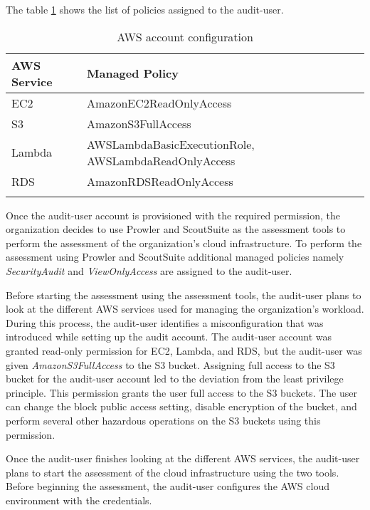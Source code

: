 The table \ref{tab:accountconfiguration} shows the list
of policies assigned to the audit-user.
\\
\begin{longtable}{|p{6cm}|p{8cm}|}
    \hline
    \textbf{AWS Service} & \textbf{Managed Policy}\\
    \hline
    EC2 & AmazonEC2ReadOnlyAccess \\
    \hline
    S3 & AmazonS3FullAccess \\
    \hline
    Lambda & AWSLambdaBasicExecutionRole,
    AWSLambdaReadOnlyAccess \\
    \hline
    RDS & AmazonRDSReadOnlyAccess \\
    \hline
    \caption{AWS account configuration}
    \label{tab:accountconfiguration}
\end{longtable}



\par Once the audit-user account is provisioned with the
required permission, the organization decides to
use Prowler and ScoutSuite as the assessment tools to perform the assessment of the organization’s cloud infrastructure.
To perform the assessment using Prowler and ScoutSuite additional managed policies namely \textit{SecurityAudit} and \textit{ViewOnlyAccess} are assigned to the audit-user.

\par Before starting the assessment using the assessment tools, the audit-user plans to look at the different AWS services used for managing the organization’s workload.
During this process, the audit-user identifies a misconfiguration that was introduced while setting up the audit account.
The audit-user account was granted read-only permission
for EC2, Lambda, and RDS, but the audit-user was given \textit{AmazonS3FullAccess} to the S3 bucket.
Assigning full access to the S3 bucket for the audit-user account led to the deviation from the least privilege principle.
This permission grants the user full access to the S3 buckets.
The user can change the block public access setting, disable encryption of the bucket, and perform several other hazardous operations on the S3 buckets using this permission.

\par Once the audit-user finishes looking at the different AWS services, the audit-user plans to start the assessment of the cloud infrastructure using the two tools.
Before beginning the assessment, the audit-user configures the AWS cloud environment with the credentials.

